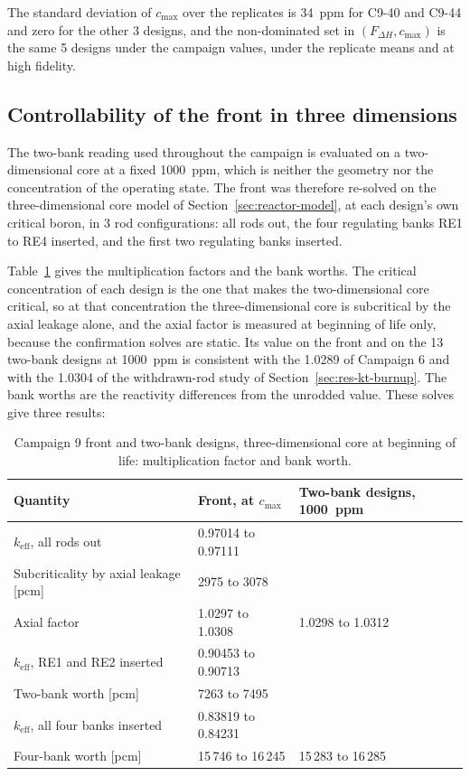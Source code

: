 The standard deviation of $c_\mathrm{max}$ over the replicates is
\SI{34}{ppm} for C9-40 and C9-44 and zero for the other 3 designs,
and the non-dominated set in $(F_{\Delta H}, c_\mathrm{max})$ is the same 5 designs under the campaign values, under the replicate means and at high
fidelity.

\subsection{Controllability of the front in three dimensions}
\label{sec:res-c9-ctrl3d}
The two-bank reading used throughout the campaign is evaluated on a
two-dimensional core at a fixed \SI{1000}{ppm}, which is neither the
geometry nor the concentration of the operating state. The front was
therefore re-solved on the three-dimensional core model of Section~\ref{sec:reactor-model},
at each design's own critical boron, in 3 rod configurations: all rods
out, the four regulating banks RE1 to RE4 inserted, and the first two
regulating banks inserted.

Table~\ref{tab:c9-ctrl3d} gives the multiplication factors and the
bank worths. The critical concentration of each design is the one that
makes the two-dimensional core critical, so at that concentration the
three-dimensional core is subcritical by the axial leakage alone, and
the axial factor is measured at beginning of life only, because the
confirmation solves are static. Its value on the front and
on the 13 two-bank designs at \SI{1000}{ppm} is consistent with the
1.0289 of Campaign 6 and with the 1.0304 of the withdrawn-rod study of
Section~\ref{sec:res-kt-burnup}. The bank worths are the reactivity
differences from the unrodded value. These solves give three results:

\begin{table}[htbp]
  \centering
  \small
  \caption{Campaign 9 front and two-bank designs, three-dimensional core at beginning of life: multiplication factor and bank worth.}
  \label{tab:c9-ctrl3d}
  \begin{tabular}{@{}lll@{}}
    \toprule
    Quantity & Front, at $c_\mathrm{max}$ & Two-bank designs, \SI{1000}{ppm} \\
    \midrule
    $k_\mathrm{eff}$, all rods out & 0.97014 to 0.97111 & \\
    Subcriticality by axial leakage [pcm] & 2975 to 3078 & \\
    Axial factor & 1.0297 to 1.0308 & 1.0298 to 1.0312 \\
    $k_\mathrm{eff}$, RE1 and RE2 inserted & 0.90453 to 0.90713 & \\
    Two-bank worth [pcm] & 7263 to 7495 & \\
    $k_\mathrm{eff}$, all four banks inserted & 0.83819 to 0.84231 & \\
    Four-bank worth [pcm] & 15\,746 to 16\,245 & 15\,283 to 16\,285 \\
    \bottomrule
  \end{tabular}
\end{table}

